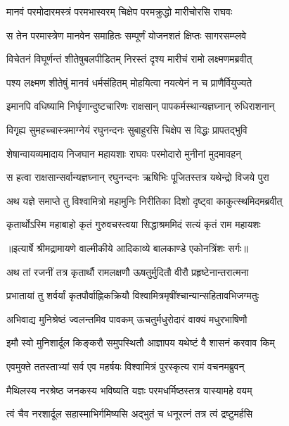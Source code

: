 \twolineshloka
{मानवं परमोदारमस्त्रं परमभास्वरम्}
{चिक्षेप परमक्रुद्धो मारीचोरसि राघवः} %

\twolineshloka
{स तेन परमास्त्रेण मानवेन समाहितः}
{सम्पूर्णं योजनशतं क्षिप्तः सागरसम्प्लवे} %

\twolineshloka
{विचेतनं विघूर्णन्तं शीतेषुबलपीडितम्}
{निरस्तं दृश्य मारीचं रामो लक्ष्मणमब्रवीत्} %

\twolineshloka
{पश्य लक्ष्मण शीतेषुं मानवं धर्मसंहितम्}
{मोहयित्वा नयत्येनं न च प्राणैर्वियुज्यते} %

\twolineshloka
{इमानपि वधिष्यामि निर्घृणान्दुष्टचारिणः}
{राक्षसान् पापकर्मस्थान्यज्ञघ्नान् रुधिराशनान्} %

\twolineshloka
{विगृह्य सुमहच्चास्त्रमाग्नेयं रघुनन्दनः}
{सुबाहुरसि चिक्षेप स विद्धः प्रापतद्भुवि} %

\twolineshloka
{शेषान्वायव्यमादाय निजघान महायशाः}
{राघवः परमोदारो मुनीनां मुदमावहन्} %

\twolineshloka
{स हत्वा राक्षसान्सर्वान्यज्ञघ्नान् रघुनन्दनः}
{ऋषिभिः पूजितस्तत्र यथेन्द्रो विजये पुरा} %

\twolineshloka
{अथ यज्ञे समाप्ते तु विश्वामित्रो महामुनिः}
{निरीतिका दिशो दृष्ट्वा काकुत्स्थमिदमब्रवीत्} %

\twolineshloka
{कृतार्थोऽस्मि महाबाहो कृतं गुरुवचस्त्वया}
{सिद्धाश्रममिदं सत्यं कृतं राम महायशः} %


{॥इत्यार्षे श्रीमद्रामायणे वाल्मीकीये आदिकाव्ये बालकाण्डे एकोनत्रिंशः सर्गः॥}


\twolineshloka
{अथ तां रजनीं तत्र कृतार्थौ रामलक्षणौ}
{ऊषतुर्मुदितौ वीरौ प्रहृष्टेनान्तरात्मना} %

\twolineshloka
{प्रभातायां तु शर्वर्यां कृतपौर्वाह्णिकक्रियौ}
{विश्वामित्रमृषींश्चान्यान्सहितावभिजग्मतुः} %

\twolineshloka
{अभिवाद्य मुनिश्रेष्ठं ज्वलन्तमिव पावकम्}
{ऊचतुर्मधुरोदारं वाक्यं मधुरभाषिणौ} %

\twolineshloka
{इमौ स्वो मुनिशार्दूल किङ्करौ समुपस्थितौ}
{आज्ञापय यथेष्टं वै शासनं करवाव किम्} %

\twolineshloka
{एवमुक्ते ततस्ताभ्यां सर्व एव महर्षयः}
{विश्वामित्रं पुरस्कृत्य रामं वचनमब्रुवन्} %

\twolineshloka
{मैथिलस्य नरश्रेष्ठ जनकस्य भविष्यति}
{यज्ञः परमधर्मिष्ठस्तत्र यास्यामहे वयम्} %

\twolineshloka
{त्वं चैव नरशार्दूल सहास्माभिर्गमिष्यसि}
{अद्भुतं च धनूरत्नं तत्र त्वं द्रष्टुमर्हसि} %

